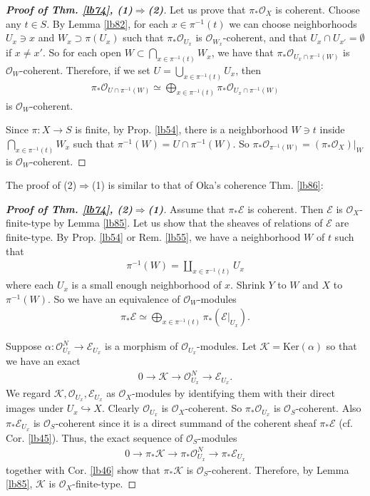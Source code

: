 \documentclass[12pt,b5paper,notitlepage]{report}
\theoremstyle{definition}
\theoremstyle{plain}
\newcommand{\scr}{\mathscr}
\newcommand{\Ker}{\mathrm{Ker}}
\numberwithin{equation}{section}
\begin{document}
\begin{proof}[\textbf{Proof of Thm. \ref{lb74}, (1)$\Rightarrow$(2)}]
Let us prove that $\pi_*\scr O_X$ is coherent. Choose any $t\in S$. By Lemma \ref{lb82}, for each $x\in\pi^{-1}(t)$ we can choose neighborhoods $U_x\ni x$ and $W_x\supset \pi(U_x)$ such that $\pi_*\scr O_{U_x}$ is $\scr O_{W_x}$-coherent, and that $U_x\cap U_{x'}=\emptyset$ if $x\neq x'$. So for each open $W\subset \bigcap_{x\in\pi^{-1}(t)}W_x$, we have that $\pi_*\scr O_{U_x\cap\pi^{-1}(W)}$ is $\scr O_W$-coherent. Therefore, if we set $U=\bigcup_{x\in\pi^{-1}(t)}U_x$, then
\begin{align*}
\pi_*\scr O_{U\cap\pi^{-1}(W)}\simeq\bigoplus_{x\in\pi^{-1}(t)}\pi_*\scr O_{U_x\cap\pi^{-1}(W)}
\end{align*}
is $\scr O_W$-coherent.

Since $\pi:X\rightarrow S$ is finite, by Prop. \ref{lb54}, there is a neighborhood $W\ni t$ inside $\bigcap_{x\in\pi^{-1}(t)}W_x$ such that $\pi^{-1}(W)=U\cap\pi^{-1}(W)$. So $\pi_*\scr O_{\pi^{-1}(W)}=(\pi_*\scr O_X)|_W$ is $\scr O_W$-coherent.
\end{proof}


The proof of (2)$\Rightarrow$(1) is similar to that of Oka's coherence Thm. \ref{lb86}:
\begin{proof}[\textbf{Proof of Thm. \ref{lb74}, (2)$\Rightarrow$(1)}]
Assume that $\pi_*\scr E$ is coherent. Then $\scr E$ is $\scr O_X$-finite-type by Lemma \ref{lb85}. Let us show that the sheaves of relations of $\scr E$ are finite-type. By Prop. \ref{lb54} or Rem. \ref{lb55}, we have a neighborhood $W$ of $t$ such that
\begin{align*}
\pi^{-1}(W)=\coprod_{x\in\pi^{-1}(t)}U_x
\end{align*}
where each $U_x$ is a small enough neighborhood of $x$. Shrink $Y$ to $W$ and $X$ to $\pi^{-1}(W)$.  So we have an equivalence of $\scr O_W$-modules
\begin{align*}
\pi_*\scr E\simeq\bigoplus_{x\in\pi^{-1}(t)}\pi_*(\scr E|_{U_x}).
\end{align*}


Suppose $\alpha:\scr O_{U_x}^N\rightarrow\scr E_{U_x}$ is a morphism of $\scr O_{U_x}$-modules. Let $\scr K=\Ker(\alpha)$ so that we have an exact
\begin{align*}
0\rightarrow\scr K\rightarrow\scr O_{U_x}^N\rightarrow\scr E_{U_x}.
\end{align*}
We regard $\scr K,\scr O_{U_x},\scr E_{U_x}$ as $\scr O_X$-modules by identifying them with their direct images under $U_x\hookrightarrow X$. Clearly $\scr O_{U_x}$ is $\scr O_X$-coherent. So $\pi_*\scr O_{U_x}$ is $\scr O_S$-coherent. Also $\pi_*\scr E_{U_x}$ is $\scr O_S$-coherent since it is a direct summand of the coherent sheaf $\pi_*\scr E$ (cf. Cor. \ref{lb45}). Thus, the exact sequence of $\scr O_S$-modules
\begin{align*}
0\rightarrow \pi_*\scr K\rightarrow \pi_*\scr O_{U_x}^N\rightarrow\pi_*\scr E_{U_x}
\end{align*}
together with Cor. \ref{lb46} show that $\pi_*\scr K$ is $\scr O_S$-coherent. Therefore, by Lemma \ref{lb85}, $\scr K$ is $\scr O_X$-finite-type.
\end{proof}
\end{document}
